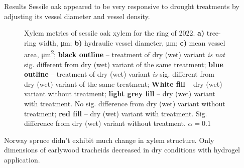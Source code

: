 \documentclass[final]{beamer}
\newlength{\sepwidth}
\newlength{\colwidth}
\newcommand{\separatorcolumn}{\begin{column}{\sepwidth}\end{column}}
\begin{document}
\begin{frame}[t]
\begin{columns}[t]
\begin{column}{\colwidth}
\end{column}


\begin{column}{\colwidth}

\begin{block}{Results}
Sessile oak appeared to be very responsive to drought treatments by adjusting its vessel diameter and vessel density.

\begin{figure}
    
    \caption{
        Xylem metrics of sessile oak xylem for the ring of 2022.
        \textbf{a)} tree-ring width, \si{\micro\meter};
        \textbf{b)} hydraulic vessel diameter, \si{\micro\meter};
        \textbf{c)} mean vessel area, \si{\micro\meter\squared};
        \textbf{\textcolor{black}{black outline}} -- treatment of dry (wet) variant \emph{is not} sig. different from dry (wet) variant of the same treatment;
        \textbf{\textcolor[RGB]{31,120,180}{blue outline}} -- treatment of dry (wet) variant \emph{is} sig. different from dry (wet) variant of the same treatment;
        \textbf{\colorbox{white}{White fill}} -- dry (wet) variant without treatment;
        \textbf{\colorbox{gray!10}{light grey fill}} -- dry (wet) variant with treatment. No sig. difference from dry (wet) variant without treatment;
        \textbf{\colorbox[RGB]{251,154,153}{red fill}} -- dry (wet) variant with treatment. Sig. difference from dry (wet) variant without treatment.
        $\alpha = 0.1$
    }
    \label{fig:oak_box}
\end{figure}

Norway spruce didn't exhibit much change in xylem structure. Only dimensions of earlywood tracheids decreased in dry conditions with hydrogel application.


\end{block}
\end{column}
\end{columns}
\end{frame}
\end{document}
